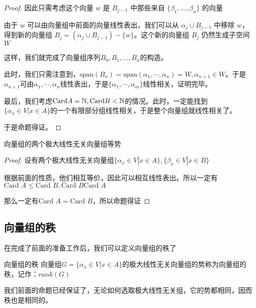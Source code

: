 \documentclass[12pt, a4paper, oneside, UTF8]{ctexbook}
\begin{document}
\begin{para}{0}
\begin{proof}
						因此只需考虑这个向量 $w$ 是 $B_{j-1}$ 中那些来自 $\{\beta _1, \dots, \beta _n\}$ 的向量

						由于 $w$ 可以由向量组中前面的向量线性表出，我们可以从 $\alpha_j \cup B_{j-1}$ 中移除 $w$，得到新的向量组 $B_j = (\alpha_j \cup B_{j-1})-\{w\}$。这个新的向量组 $B_j$ 仍然生成子空间 $W$
						
						这样，我们就完成了向量组序列$B_0, B_1, \dots, B_n$的构造。
						
						此时，我们只需注意到，$\text{span}(B_n)=\text{span}(\alpha_1,\cdots,\alpha _n)=W,\alpha_{n+1} \in W$。于是$\alpha_{n+1}$可由$\alpha_1,\cdots,\alpha_n$线性表出，于是$\{\alpha_1,\cdots,\alpha_m\}$线性相关，证明完毕。

						最后，我们考虑$\text{Card} A = \mathbb{N},\text{Card} B < \mathbb{N}$的情况。此时，一定能找到$\{\alpha_x \in V | x \in A\}$的一个有限部分组线性相关，于是整个向量组就线性相关了。

						于是命题得证。
					\end{proof}
					\begin{proposition}
						向量组的两个极大线性无关向量组等势
					\end{proposition}
					\begin{proof}
						设有两个极大线性无关向量组$\{\alpha_x \in V| x\in A\},\{\beta_x \in V| x \in B\}$

						根据前面的性质，他们相互等价，因此可以相互线性表出。所以一定有$\text{Card }A \leqslant \text{Card }B,\text{Card }B \text{Card }A$

						那么一定有$\text{Card }A = \text{Card }B$，所以命题得证
					\end{proof}
			\end{para}
		\subsection{向量组的秩}
			在完成了前面的准备工作后，我们可以定义向量组的秩了
			\begin{defn}{向量组的秩}{}
				向量组$G=\{\alpha_x \in V| x \in A\}$的极大线性无关向量组的势称为向量组的秩，记作：$rank(G)$
			\end{defn}
			我们前面的命题已经保证了，无论如何选取极大线性无关组，它的势都相同，因而秩也是相同的。
			
\end{document}
